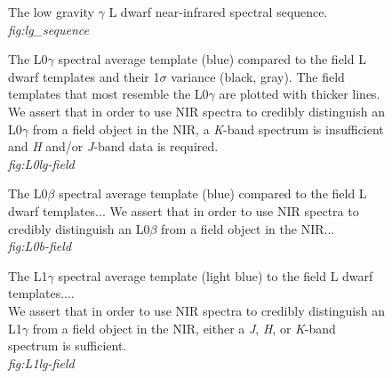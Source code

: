 \documentclass[12pt,preprint]{aastex}
\begin{document}
\begin{figure}
	\caption{The low gravity $\gamma$ L dwarf near-infrared spectral sequence. \\
	\emph{fig:lg_sequence}}
	\label{fig:lg_sequence}
\end{figure}
	


\begin{figure}
	\caption{The L0$\gamma$ spectral average template (blue) compared to the field L dwarf templates and their 1$\sigma$ variance (black, gray). The field templates that most resemble the L0$\gamma$ are plotted with thicker lines. We assert that in order to use NIR spectra to credibly distinguish an L0$\gamma$ from a field object in the NIR, a \emph{K}-band spectrum is insufficient and \emph{H} and/or \emph{J}-band data is required.\\
	\emph{fig:L0lg-field}}
	\label{fig:L0lg-field}
\end{figure}

\begin{figure}
	\caption{The L0$\beta$ spectral average template (blue) compared to the field L dwarf templates... We assert that in order to use NIR spectra to credibly distinguish an L0$\beta$ from a field object in the NIR...\\
	\emph{fig:L0b-field}}
	\label{fig:L0b-field}
\end{figure}

\begin{figure}
	\caption{The L1$\gamma$ spectral average template (light blue) to the field L dwarf templates.... \\
	We assert that in order to use NIR spectra to credibly distinguish an L1$\gamma$ from a field object in the NIR, either a \emph{J}, \emph{H}, or \emph{K}-band spectrum is sufficient. \\
	\emph{fig:L1lg-field}}
	\label{fig:L1lg-field}
\end{figure}
\end{document}
